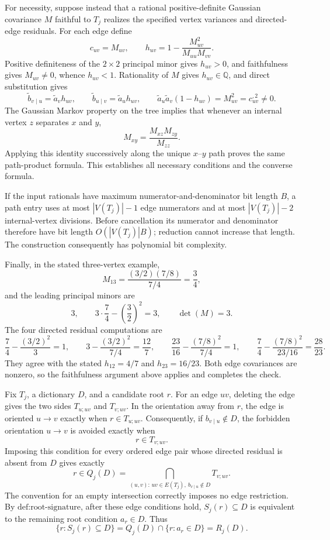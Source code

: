For necessity, suppose instead that a rational positive-definite Gaussian covariance \(M\) faithful to \(T_j\) realizes the specified vertex variances and directed-edge residuals.  For each edge define
\[
 c_{uv}=M_{uv},
 \qquad
 h_{uv}=1-\frac{M_{uv}^{2}}{M_{uu}M_{vv}}.
\]
Positive definiteness of the \(2\times2\) principal minor gives \(h_{uv}>0\), and faithfulness gives \(M_{uv}\ne0\), whence \(h_{uv}<1\).  Rationality of \(M\) gives \(h_{uv}\in\mathbb Q\), and direct substitution gives
\[
 \widetilde b_{v\mid u}=\widetilde a_vh_{uv},
 \qquad
 \widetilde b_{u\mid v}=\widetilde a_uh_{uv},
 \qquad
 \widetilde a_u\widetilde a_v(1-h_{uv})=M_{uv}^2=c_{uv}^{,2}\ne0.
\]
The Gaussian Markov property on the tree implies that whenever an internal vertex \(z\) separates \(x\) and \(y\),
\[
 M_{xy}=\frac{M_{xz}M_{zy}}{M_{zz}}.
\]
Applying this identity successively along the unique \(x\)--\(y\) path proves the same path-product formula.  This establishes all necessary conditions and the converse formula.

If the input rationals have maximum numerator-and-denominator bit length \(B\), a path entry uses at most \(|V(T_j)|-1\) edge numerators and at most \(|V(T_j)|-2\) internal-vertex divisions.  Before cancellation its numerator and denominator therefore have bit length \(O(|V(T_j)|B)\); reduction cannot increase that length.  The construction consequently has polynomial bit complexity.

Finally, in the stated three-vertex example,
\[
 M_{13}=\frac{(3/2)(7/8)}{7/4}=\frac34,
\]
and the leading principal minors are
\[
 3,\qquad 3\cdot\frac74-\left(\frac32\right)^2=3,
 \qquad \det(M)=3.
\]
The four directed residual computations are
\[
 \frac74-\frac{(3/2)^2}{3}=1,
 \qquad
 3-\frac{(3/2)^2}{7/4}=\frac{12}{7},
 \qquad
 \frac{23}{16}-\frac{(7/8)^2}{7/4}=1,
 \qquad
 \frac74-\frac{(7/8)^2}{23/16}=\frac{28}{23}.
\]
They agree with the stated \(h_{12}=4/7\) and \(h_{23}=16/23\).  Both edge covariances are nonzero, so the faithfulness argument above applies and completes the check.

Fix \(T_j\), a dictionary \(D\), and a candidate root \(r\).  For an edge \(uv\), deleting the edge gives the two sides \(T_{u;uv}\) and \(T_{v;uv}\).  In the orientation away from \(r\), the edge is oriented \(u\to v\) exactly when \(r\in T_{u;uv}\).  Consequently, if \(b_{v\mid u}\notin D\), the forbidden orientation \(u\to v\) is avoided exactly when
\[
 r\in T_{v;uv}.
\]
Imposing this condition for every ordered edge pair whose directed residual is absent from \(D\) gives exactly
\[
 r\in Q_j(D)
 =\bigcap_{(u,v):\,uv\in E(T_j),\ b_{v\mid u}\notin D}T_{v;uv}.
\]
The convention for an empty intersection correctly imposes no edge restriction.  By \(\text{def:root-signature}\), after these edge conditions hold, \(S_j(r)\subseteq D\) is equivalent to the remaining root condition \(a_r\in D\).  Thus
\[
 \{r:S_j(r)\subseteq D\}
 =Q_j(D)\cap\{r:a_r\in D\}=R_j(D).
\]

